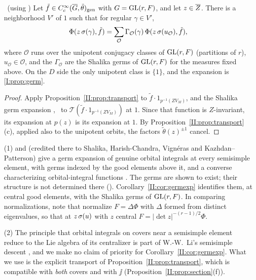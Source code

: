 \begin{corollary}\label{II:cor:germexp}\ (using \Ev)
Let $\tilde f\in C_c^\infty(\overline{G},\tilde\theta)_{\mathrm{gen}}$ with $G=\mathrm{GL}(r,F)$, and let $z\in\overline{Z}$. There is a neighborhood $V'$ of $1$ such that for regular $\gamma\in V'$,
\[ \Phi(z\,\sigma(\gamma),\tilde f)=\sum_{\mathcal O}\Gamma_{\mathcal O}(\gamma)\,\Phi(z\,\sigma(u_{\mathcal O}),\tilde f), \]
where $\mathcal O$ runs over the unipotent conjugacy classes of $\mathrm{GL}(r,F)$ (partitions of $r$), $u_{\mathcal O}\in\mathcal O$, and the $\Gamma_{\mathcal O}$ are the Shalika germs of $\mathrm{GL}(r,F)$ for the measures fixed above. On the $D$ side the only unipotent class is $\{1\}$, and the expansion is \cref{I:prop:germ}.
\end{corollary}
\begin{proof}
Apply Proposition~\ref{II:prop:transport} to $\tilde f\cdot1_{p^{-1}(ZV_M)}$, and the Shalika germ expansion \cite{Sha72}, \cite{HC70} \Ev\ to $\mathcal T(\tilde f\cdot1_{p^{-1}(ZV_M)})$ at $1$. Since that function is $Z$-invariant, its expansion at $p(z)$ is its expansion at $1$. By Proposition~\ref{II:prop:transport}(c), applied also to the unipotent orbits, the factors $\tilde\theta(z)^{\pm1}$ cancel.
\end{proof}



\begin{remark}\label{II:rem:FK8}
(1) \cite[\S8, Theorem]{FK86} and \cite[Theorem~1.4]{KP86} (credited there to Shalika, Harish-Chandra, Vign\'eras and Kazhdan--Patterson) give a germ expansion of genuine orbital integrals at every semisimple element, with germs indexed by the good elements above it, and a converse characterizing orbital-integral functions \cite[Theorem~1.7]{KP86}. The germs are shown to exist; their structure is not determined there (\cite[\S1, Remark~2]{KP86}). Corollary~\ref{II:cor:germexp} identifies them, at central good elements, with the Shalika germs of $\mathrm{GL}(r,F)$. In comparing normalizations, note that \cite{FK86} normalize $F=\Delta\Phi$ with $\Delta$ formed from distinct eigenvalues, so that at $z\,\sigma(u)$ with $z$ central $F=|\det z|^{-(r-1)/2}\Phi$.

(2) The principle that orbital integrals on covers near a semisimple element reduce to the Lie algebra of its centralizer is part of W.-W.~Li's semisimple descent \cite[\S4]{Li12}, and we make no claim of priority for Corollary~\ref{II:cor:germexp}. What we use is the explicit transport of Proposition~\ref{II:prop:transport}, which is compatible with \emph{both} covers and with $\jj$ (Proposition~\ref{II:prop:section}(f)).
\end{remark}

